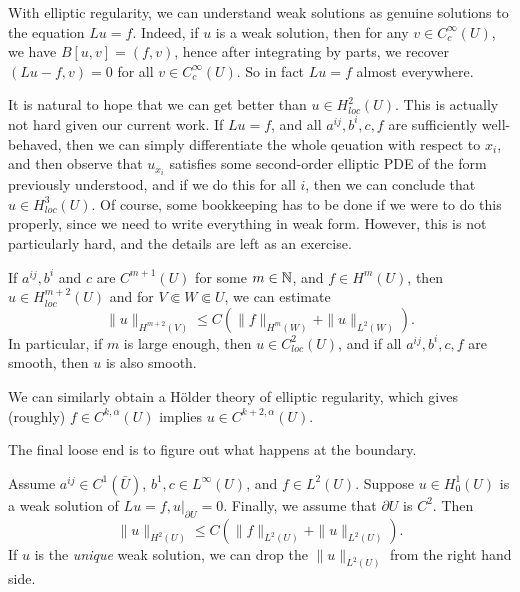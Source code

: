 \documentclass[a4paper]{article}
\begin{document}
With elliptic regularity, we can understand weak solutions as genuine solutions to the equation $Lu = f$. Indeed, if $u$ is a weak solution, then for any $v \in C_c^\infty(U)$, we have $B[u, v] = (f, v)$, hence after integrating by parts, we recover $(Lu - f, v) = 0$ for all $v \in C_c^\infty(U)$. So in fact $Lu = f$ almost everywhere.

It is natural to hope that we can get better than $u \in H^2_{loc}(U)$. This is actually not hard given our current work. If $Lu = f$, and all $a^{ij}, b^i, c, f$ are sufficiently well-behaved, then we can simply differentiate the whole qeuation with respect to $x_i$, and then observe that $u_{x_i}$ satisfies some second-order elliptic PDE of the form previously understood, and if we do this for all $i$, then we can conclude that $u \in H^3_{loc}(U)$. Of course, some bookkeeping has to be done if we were to do this properly, since we need to write everything in weak form. However, this is not particularly hard, and the details are left as an exercise.

\begin{thm}
  If $a^{ij}, b^i$ and $c$ are $C^{m + 1}(U)$ for some $m \in \mathbb{N}$, and $f \in H^m(U)$, then $u \in H^{m + 2}_{loc}(U)$ and for $V \Subset W \Subset U$, we can estimate
  \[
    \|u\|_{H^{m + 2}(V)} \leq C (\|f\|_{H^m(W)} + \|u\|_{L^2(W)}).
  \]
  In particular, if $m$ is large enough, then $u \in C^2_{loc}(U)$, and if all $a^{ij}, b^i, c, f$ are smooth, then $u$ is also smooth.
\end{thm}

We can similarly obtain a H\"older theory of elliptic regularity, which gives (roughly) $f \in C^{k, \alpha}(U)$ implies $u \in C^{k + 2, \alpha}(U)$.

The final loose end is to figure out what happens at the boundary.

\begin{thm}
  Assume $a^{ij} \in C^1(\bar{U})$, $b^1, c \in L^\infty(U)$, and $f \in L^2(U)$. Suppose $u \in H_0^1(U)$ is a weak solution of $Lu = f, u|_{\partial U} = 0$. Finally, we assume that $\partial U$ is $C^2$. Then
  \[
    \|u\|_{H^2(U)} \leq C (\|f\|_{L^2(U)} + \|u\|_{L^2(U)}).
  \]
  If $u$ is the \emph{unique} weak solution, we can drop the $\|u\|_{L^2(U)}$ from the right hand side.
\end{thm}
\end{document}
